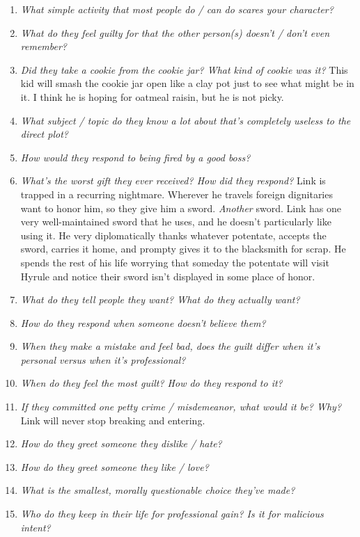 \begin{enumerate}
    \item\textit{What simple activity that most people do / can do scares your character?}
    \item\textit{What do they feel guilty for that the other person(s) doesn’t / don’t even remember?}
    \item\textit{Did they take a cookie from the cookie jar? What kind of cookie was it?}
        This kid will smash the cookie jar open like a clay pot just to see what might be in it. I think he is hoping for oatmeal raisin, but he is not picky.
    \item\textit{What subject / topic do they know a lot about that’s completely useless to the direct plot?}
    \item\textit{How would they respond to being fired by a good boss?}
    \item\textit{What’s the worst gift they ever received? How did they respond?}
        Link is trapped in a recurring nightmare. Wherever he travels foreign dignitaries want to honor him, so they give him a sword. \emph{Another} sword. Link has one very well-maintained sword that he uses, and he doesn't particularly like using it. He very diplomatically thanks whatever potentate, accepts the sword, carries it home, and prompty gives it to the blacksmith for scrap. He spends the rest of his life worrying that someday the potentate will visit Hyrule and notice their sword isn't displayed in some place of honor.
    \item\textit{What do they tell people they want? What do they actually want?}
    \item\textit{How do they respond when someone doesn’t believe them?}
    \item\textit{When they make a mistake and feel bad, does the guilt differ when it’s personal versus when it’s professional?}
    \item\textit{When do they feel the most guilt? How do they respond to it?}
    \item\textit{If they committed one petty crime / misdemeanor, what would it be? Why?}
        Link will never stop breaking and entering.
    \item\textit{How do they greet someone they dislike / hate?}
    \item\textit{How do they greet someone they like / love?}
    \item\textit{What is the smallest, morally questionable choice they’ve made?}
    \item\textit{Who do they keep in their life for professional gain? Is it for malicious intent?}

\end{enumerate}
